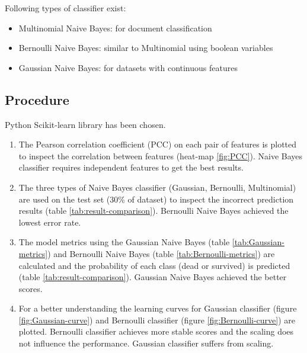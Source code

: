 \documentclass{article}
\begin{document}
\bigskip
Following types of classifier exist:
\begin{itemize}
	\item Multinomial Naive Bayes: for document classification
	\item Bernoulli Naive Bayes: similar to Multinomial using boolean variables
	\item Gaussian Naive Bayes: for datasets with continuous features
\end{itemize}

\subsection{Procedure}
Python Scikit-learn library has been chosen.
\begin{enumerate}  
	\item The Pearson correlation coefficient (PCC) on each pair of features is plotted to inspect the correlation between features (heat-map \ref{fig:PCC}). Naive Bayes classifier requires independent features to get the best results.
	\item The three types of Naive Bayes classifier (Gaussian, Bernoulli, Multinomial) are used on the test set (30\% of dataset) to inspect the incorrect prediction results (table \ref{tab:result-comparison}). Bernoulli Naive Bayes achieved the lowest error rate.
	\item The model metrics using the Gaussian Naive Bayes (table \ref{tab:Gaussian-metrics}) and Bernoulli Naive Bayes (table \ref{tab:Bernoulli-metrics}) are calculated and the probability of each class (dead or survived) is predicted (table \ref{tab:result-comparison}). Gaussian Naive Bayes achieved the better scores.
	\item For a better understanding the learning curves for Gaussian classifier (figure \ref{fig:Gaussian-curve}) and Bernoulli classifier (figure \ref{fig:Bernoulli-curve}) are plotted. Bernoulli classifier achieves more stable scores and the scaling does not influence the performance. Gaussian classifier suffers from scaling.
\end{enumerate}
\end{document}
